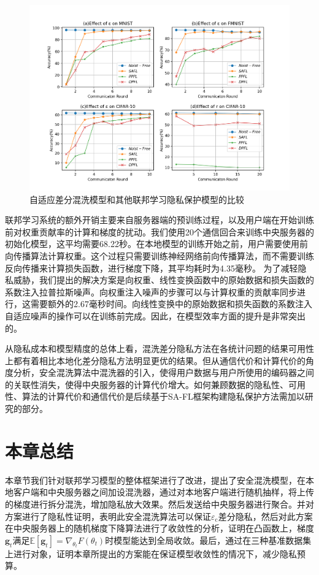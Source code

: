 \begin{figure}[!hbt]
\centering
  	\includegraphics[scale=0.5]{fig2/C4/SA-FL3}%
	\caption{自适应差分混洗模型和其他联邦学习隐私保护模型的比较}
  	\label{自适应差分混洗模型和其他联邦学习隐私保护模型的比较} 
\end{figure}

联邦学习系统的额外开销主要来自服务器端的预训练过程，以及用户端在开始训练前对权重贡献率的计算和梯度的扰动。我们使用20个通信回合来训练中央服务器的初始化模型，这平均需要68.22秒。在本地模型的训练开始之前，用户需要使用前向传播算法计算权重。这个过程只需要训练神经网络前向传播算法，而不需要训练反向传播来计算损失函数，进行梯度下降，其平均耗时为4.35毫秒。
为了减轻隐私威胁，我们提出的解决方案是向权重、线性变换函数中的原始数据和损失函数的系数注入拉普拉斯噪声。向权重注入噪声的步骤可以与计算权重的贡献率同步进行，这需要额外的2.67毫秒时间。向线性变换中的原始数据和损失函数的系数注入自适应噪声的操作可以在训练前完成。因此，在模型效率方面的提升是非常突出的。

从隐私成本和模型精度的总体上看，混洗差分隐私方法在各统计问题的结果可用性上都有着相比本地化差分隐私方法明显更优的结果。但从通信代价和计算代价的角度分析，安全混洗算法中混洗器的引入，使得用户数据与用户所使用的编码器之间的关联性消失，使得中央服务器的计算代价增大。如何兼顾数据的隐私性、可用性、算法的计算代价和通信代价是后续基于SA-FL框架构建隐私保护方法需加以研究的部分。


\section{本章总结}
本章节我们针对联邦学习模型的整体框架进行了改进，提出了安全混洗模型，在本地客户端和中央服务器之间加设混洗器，通过对本地客户端进行随机抽样，将上传的梯度进行拆分混洗，增加隐私放大效果。然后发送给中央服务器进行聚合。并对方案进行了隐私性证明，表明此安全混洗算法可以保证$\varepsilon_{\mathrm{c}}$差分隐私，然后对此方案在中央服务器上的随机梯度下降算法进行了收敛性的分析，证明在凸函数上，梯度$\mathbf{g}_{t}$满足$\mathbb{E}\left[\mathbf{g}_{t}\right]=\nabla_{\theta_{t}} F\left(\theta_{t}\right)$时模型能达到全局收敛。最后，通过在三种基准数据集上进行对象，证明本章所提出的方案能在保证模型收敛性的情况下，减少隐私预算。


